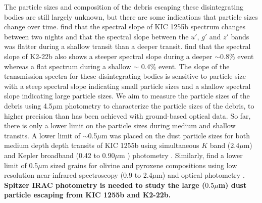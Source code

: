 \documentclass[letterpaper,12pt]{article}
\begin{document}
The particle sizes and composition of the debris escaping these disintegrating bodies are still largely unknown, but there are some indications that particle sizes change over time.
\citet{bochinski2015evolving} find that the spectral slope of KIC 1255b spectrum changes between two nights and that the spectral slope between the $u'$, $g'$ and $z'$ bands was flatter during a shallow transit than a deeper transit. 
\cite{sanchis-ojedak2-22} find that the spectral slope of K2-22b also shows a steeper spectral slope during a deeper $\sim 0.8\%$ event whereas a flat spectrum during a shallow $\sim$ 0.4\% event.
The slope of the transmission spectra for these disintegrating bodies is sensitive to particle size with a steep spectral slope indicating small particle sizes and a shallow spectral slope indicating large particle sizes.
We aim to measure the particle sizes of the debris using 4.5$\mu$m photometry to characterize the particle sizes of the debris, to higher precision than has been achieved with ground-based optical data.
So far, there is only a lower limit on the particle sizes during medium and shallow transits.
A lower limit of $\sim$0.5$\mu$m was placed on the dust particle sizes for both medium depth depth transits of KIC 1255b using simultaneous $K$ band (2.4$\mu$m) and Kepler broadband (0.42 to 0.90$\mu$m ) photometry \citep{croll2014}.
Similarly, \citep{schlawin2016kic1255} find a lower limit of 0.5$\mu$m sized grains for olivine and pyroxene compositions using low resolution near-infrared spectroscopy (0.9 to 2.4$\mu$m) and optical photometry \citep{schlawin2016kic1255}.
\textbf{Spitzer IRAC photometry is needed to study the large ($0.5\mu$m) dust particle escaping from KIC 1255b and K2-22b.}\newline



%
\end{document}
